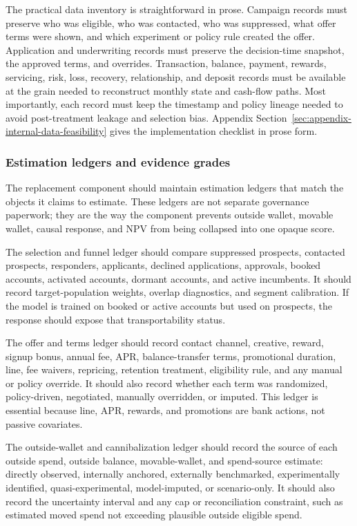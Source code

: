 \documentclass[11pt]{article}
\newcommand{\1}{\mathbf{1}}
\begin{document}
The practical data inventory is straightforward in prose.  Campaign records
must preserve who was eligible, who was contacted, who was suppressed, what
offer terms were shown, and which experiment or policy rule created the offer.
Application and underwriting records must preserve the decision-time snapshot,
the approved terms, and overrides.  Transaction, balance, payment, rewards,
servicing, risk, loss, recovery, relationship, and deposit records must be
available at the grain needed to reconstruct monthly state and cash-flow paths.
Most importantly, each record must keep the timestamp and policy lineage needed
to avoid post-treatment leakage and selection bias. Appendix
Section~\ref{sec:appendix-internal-data-feasibility} gives the implementation
checklist in prose form.

\subsubsection{Estimation ledgers and evidence grades}

The replacement component should maintain estimation ledgers that match the
objects it claims to estimate. These ledgers are not separate governance
paperwork; they are the way the component prevents outside wallet, movable
wallet, causal response, and NPV from being collapsed into one opaque score.

The selection and funnel ledger should compare suppressed prospects,
contacted prospects, responders, applicants, declined applications, approvals,
booked accounts, activated accounts, dormant accounts, and active incumbents.
It should record target-population weights, overlap diagnostics, and segment
calibration. If the model is trained on booked or active accounts but used on
prospects, the response should expose that transportability status.

The offer and terms ledger should record contact channel, creative, reward,
signup bonus, annual fee, APR, balance-transfer terms, promotional duration,
line, fee waivers, repricing, retention treatment, eligibility rule, and any
manual or policy override. It should also record whether each term was
randomized, policy-driven, negotiated, manually overridden, or imputed. This
ledger is essential because line, APR, rewards, and promotions are bank
actions, not passive covariates.

The outside-wallet and cannibalization ledger should record the source of each
outside spend, outside balance, movable-wallet, and spend-source estimate:
directly observed, internally anchored, externally benchmarked,
experimentally identified, quasi-experimental, model-imputed, or scenario-only.
It should also record the uncertainty interval and any cap or reconciliation
constraint, such as estimated moved spend not exceeding plausible outside
eligible spend.
\end{document}
